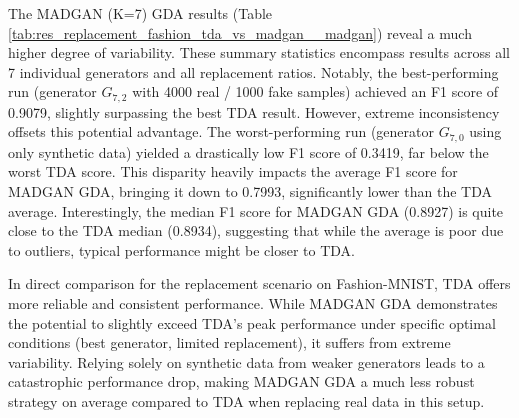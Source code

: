 The MADGAN (K=7) GDA results (Table \ref{tab:res_replacement_fashion_tda_vs_madgan__madgan}) reveal a much higher degree of variability. These summary statistics encompass results across all 7 individual generators and all replacement ratios. Notably, the best-performing run (generator \(G_{7,2}\) with 4000 real / 1000 fake samples) achieved an F1 score of 0.9079, slightly surpassing the best TDA result. However, extreme inconsistency offsets this potential advantage. The worst-performing run (generator \(G_{7,0}\) using only synthetic data) yielded a drastically low F1 score of 0.3419, far below the worst TDA score. This disparity heavily impacts the average F1 score for MADGAN GDA, bringing it down to 0.7993, significantly lower than the TDA average. Interestingly, the median F1 score for MADGAN GDA (0.8927) is quite close to the TDA median (0.8934), suggesting that while the average is poor due to outliers, typical performance might be closer to TDA.

In direct comparison for the replacement scenario on Fashion-MNIST, TDA offers more reliable and consistent performance. While MADGAN GDA demonstrates the potential to slightly exceed TDA's peak performance under specific optimal conditions (best generator, limited replacement), it suffers from extreme variability. Relying solely on synthetic data from weaker generators leads to a catastrophic performance drop, making MADGAN GDA a much less robust strategy on average compared to TDA when replacing real data in this setup.


